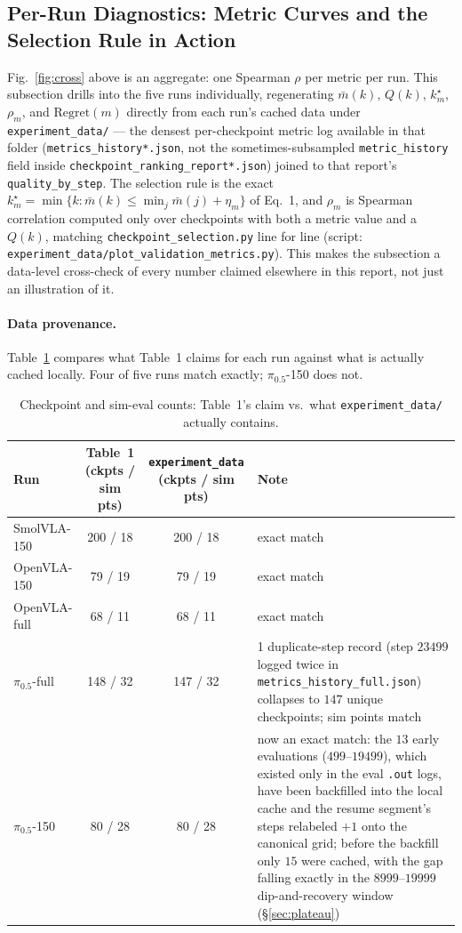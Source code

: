 \documentclass[11pt]{article}
\begin{document}
\subsection*{Per-Run Diagnostics: Metric Curves and the Selection Rule in Action}
\label{sec:perrun-diag}

Fig.~\ref{fig:cross} above is an aggregate: one Spearman $\rho$ per metric per run. This subsection
drills into the five runs individually, regenerating $\bar m(k)$, $Q(k)$, $k_m^\star$, $\rho_m$, and
$\mathrm{Regret}(m)$ directly from each run's cached data under \texttt{experiment\_data/} --- the
densest per-checkpoint metric log available in that folder (\texttt{metrics\_history*.json}, not the
sometimes-subsampled \texttt{metric\_history} field inside \texttt{checkpoint\_ranking\_report*.json})
joined to that report's \texttt{quality\_by\_step}. The selection rule is the exact
$k_m^\star=\min\{k:\bar m(k)\le\min_j\bar m(j)+\eta_m\}$ of Eq.~1, and $\rho_m$ is Spearman correlation
computed only over checkpoints with both a metric value and a $Q(k)$, matching
\texttt{checkpoint\_selection.py} line for line (script:
\texttt{experiment\_data/plot\_validation\_metrics.py}). This makes the subsection a data-level
cross-check of every number claimed elsewhere in this report, not just an illustration of it.

\paragraph{Data provenance.} Table~\ref{tab:data-provenance} compares what Table~1 claims for each run
against what is actually cached locally. Four of five runs match exactly; $\pi_{0.5}$-150 does not.

\begin{table}[h]
\centering
\footnotesize
\caption{Checkpoint and sim-eval counts: Table~1's claim vs.\ what \texttt{experiment\_data/} actually
contains.}
\label{tab:data-provenance}
\begin{tabular}{lccl}
\toprule
Run & Table~1 (ckpts / sim pts) & \texttt{experiment\_data} (ckpts / sim pts) & Note \\
\midrule
SmolVLA-150 & 200 / 18 & 200 / 18 & exact match \\
OpenVLA-150 & 79 / 19 & 79 / 19 & exact match \\
OpenVLA-full & 68 / 11 & 68 / 11 & exact match \\
$\pi_{0.5}$-full & 148 / 32 & 147 / 32 & 1 duplicate-step record (step $23499$ logged twice in
\texttt{metrics\_history\_full.json}) collapses to $147$ unique checkpoints; sim points match \\
$\pi_{0.5}$-150 & 80 / 28 & 80 / 28 & now an exact match: the $13$ early evaluations
($499$--$19499$), which existed only in the eval \texttt{.out} logs, have been backfilled into the
local cache and the resume segment's steps relabeled $+1$ onto the canonical grid; before the
backfill only $15$ were cached, with the gap falling exactly in the $8999$--$19999$ dip-and-recovery
window (\S\ref{sec:plateau}) \\
\bottomrule
\end{tabular}
\end{table}
\end{document}
